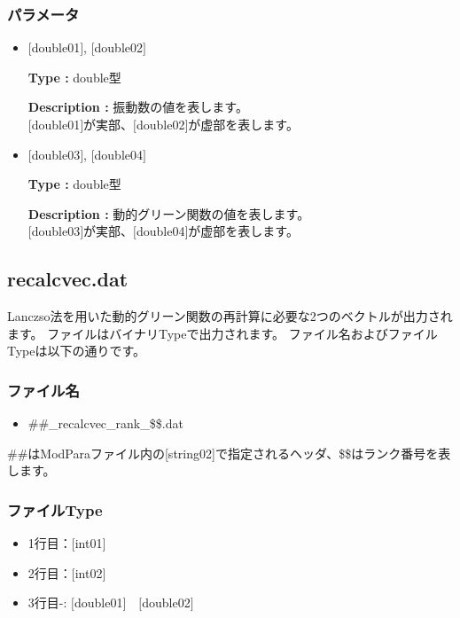 \subsubsection{パラメータ}
 \begin{itemize}

 \item  $[$double01$]$, $[$double02$]$

 {\bf Type :} double型 

 {\bf Description :} 振動数の値を表します。\\
$[$double01$]$が実部、$[$double02$]$が虚部を表します。\\

 \item  $[$double03$]$, $[$double04$]$

 {\bf Type :} double型 

 {\bf Description :} 動的グリーン関数の値を表します。\\
$[$double03$]$が実部、$[$double04$]$が虚部を表します。\\

\end{itemize}


\newpage
\subsection{{recalcvec.dat}}
\label{Subsec:restart}
Lanczso法を用いた動的グリーン関数の再計算に必要な2つのベクトルが出力されます。
ファイルはバイナリTypeで出力されます。
ファイル名およびファイルTypeは以下の通りです。

\subsubsection{ファイル名}
\begin{itemize}
   \item{\#\#\_recalcvec\_rank\_\$\$.dat}
\end{itemize}
  \#\#はModParaファイル内の[string02]で指定されるヘッダ、\$\$はランク番号を表します。

\subsubsection{ファイルType}
 \begin{itemize}
   \item  1行目：$[$int01$]$
   \item  2行目：$[$int02$]$
   \item  3行目-: $[$double01$]$~~$[$double02$]$
  \end{itemize}
